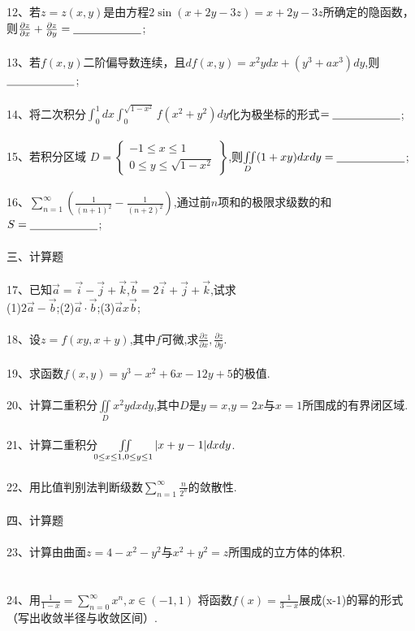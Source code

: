 \documentclass[12pt,a3paper]{article}
\begin{document}
12、若$z=z(x,y)$是由方程$2\sin(x+2y-3z)=x+2y-3z$所确定的隐函数，则$\frac{\partial z}{\partial x} + \frac{\partial z}{\partial y}=\underline{\makebox[6em]{}}$;
\\\\
13、若$f(x,y)$二阶偏导数连续，且$df(x,y)=x^2ydx+(y^3+ax^3)dy$,则$\underline{\makebox[6em]{}}$;
\\\\
14、将二次积分$\int_0^1dx\int_0^{\sqrt{1-x^2}}f(x^2+y^2)dy$化为极坐标的形式$=\underline{\makebox[6em]{}}$;
\\\\
15、若积分区域
$D = \left.
\begin{cases}
  -1 \leq x \leq 1 \\
  0 \leq y \leq \sqrt{1-x^2}
\end{cases}
\right\}
$,则$\iint\limits_D (1+xy)dxdy=\underline{\makebox[6em]{}}$;
\\\\
16、$\sum\limits_{n=1}^\infty(\frac{1}{(n+1)^2}-\frac{1}{(n+2)^2})$,通过前$n$项和的极限求级数的和$S=\underline{\makebox[6em]{}}$;
\\\\
三、计算题
\\\\
17、已知$\vec{a}=\vec{i}-\vec{j}+\vec{k}$,$\vec{b}=2\vec{i}+\vec{j}+\vec{k}$,试求\\
(1)$2\vec{a}-\vec{b}$;(2)$\vec{a}\cdot\vec{b}$;(3)$\vec{a}x\vec{b}$;
\\\\
18、设$z=f(xy,x+y)$,其中$f$可微,求$\frac{\partial z}{\partial x}, \frac{\partial z}{\partial y}$.
\\\\
19、求函数$f(x,y)=y^3-x^2+6x-12y+5$的极值.
\\\\
20、计算二重积分$\iint\limits_D x^2ydxdy$,其中$D$是$y=x$,$y=2x$与$x=1$所围成的有界闭区域.
\\\\
21、计算二重积分$\iint\limits_{0\leq x\leq 1, \\0\leq y\leq 1}|x+y-1|dxdy$.
\\\\
22、用比值判别法判断级数$\sum\limits_{n=1}^\infty\frac{n}{2^n}$的敛散性.
\\\\
四、计算题
\\\\
23、计算由曲面$z=4-x^2-y^2$与$x^2+y^2=z$所围成的立方体的体积.
\\\\\\
24、用$\frac{1}{1-x}=\sum\limits_{n=0}^\infty x^n,x\in (-1,1)$ 将函数$f(x)=\frac{1}{3-x}$展成(x-1)的幂的形式（写出收敛半径与收敛区间）.
\end{document}

